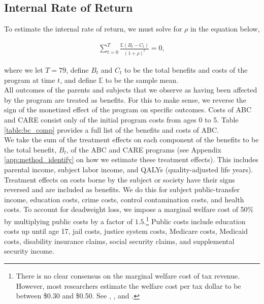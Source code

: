 \subsection{Internal Rate of Return}
\label{app:method_irr}

\noindent To estimate the internal rate of return, we must solve for $\rho$ in the equation below,

\begin{align}
\sum_{t=0}^T \frac{ \mathbb{E} (B_t - C_t)}{(1+\rho)^t} = 0,
\end{align}

\noindent where we let $T = 79$, define $B_t$ and $C_t$ to be the total benefits and costs of the
program at time $t$, and define $\mathbb{E}$ to be the sample mean. \\

\noindent All outcomes of the parents and subjects that we observe as having been affected by the program
are treated as benefits. For this to make sense, we reverse the sign of the monetized effect of the program
on specific outcomes. Costs of ABC and CARE consist only of the initial program costs from ages 0 to 5.
Table \ref{table:bc_comp} provides a full list of the benefits and costs of ABC. \\

\noindent We take the sum of the treatment effects on each component of the benefits to
be the total benefit, $B_t$, of the ABC and CARE programs (see Appendix \ref{app:method_identify} on how
we estimate these treatment effects). This includes parental income, subject labor income, and QALYs
(quality-adjusted life years).
Treatment effects on costs borne by the subject or society have their signs
reversed and are included as benefits. We do this for subject public-transfer income,
education costs, crime costs,
control contamination costs, and health costs. To account for deadweight loss, we
impose a marginal welfare cost of 50\% by multiplying public costs by a factor of
$1.5$.\footnote{There is no clear consensus on the marginal welfare cost of tax revenue. However,
most researchers estimate the welfare cost per tax dollar to be between \$0.30 and \$0.50. See
\citet{Feldstein_1999_REStat}, \citet{Heckman_Smith_1998_evaluating}, and \citet{Browning_1987_AER}.} Public costs include education costs up until age 17, jail costs, justice system costs, Medicare costs,
Medicaid costs, disability insurance claims, social security claims, and supplemental security
income. \\

